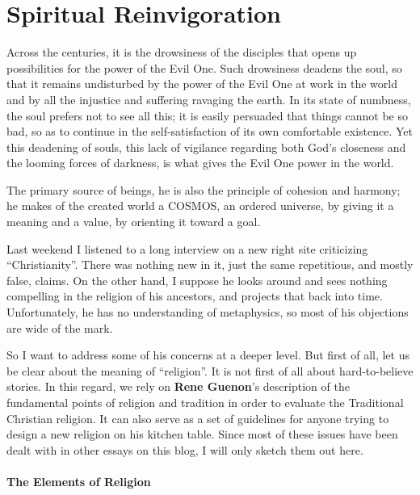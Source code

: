 \section{Spiritual Reinvigoration}

\begin{quotex}
Across the centuries, it is the drowsiness of the disciples that opens up possibilities for the power of the Evil One. Such drowsiness deadens the soul, so that it remains undisturbed by the power of the Evil One at work in the world and by all the injustice and suffering ravaging the earth. In its state of numbness, the soul prefers not to see all this; it is easily persuaded that things cannot be so bad, so as to continue in the self-satisfaction of its own comfortable existence. Yet this deadening of souls, this lack of vigilance regarding both God's closeness and the looming forces of darkness, is what gives the Evil One power in the world.

The primary source of beings, he is also the principle of cohesion and harmony; he makes of the created world a COSMOS, an ordered universe, by giving it a meaning and a value, by orienting it toward a goal.
\end{quotex}


Last weekend I listened to a long interview on a new right site criticizing ``Christianity''. There was nothing new in it, just the same repetitious, and mostly false, claims. On the other hand, I suppose he looks around and sees nothing compelling in the religion of his ancestors, and projects that back into time. Unfortunately, he has no understanding of metaphysics, so most of his objections are wide of the mark.

So I want to address some of his concerns at a deeper level. But first of all, let us be clear about the meaning of ``religion''. It is not first of all about hard-to-believe stories. In this regard, we rely on \textbf{Rene Guenon}'s description of the fundamental points of religion and tradition in order to evaluate the Traditional Christian religion. It can also serve as a set of guidelines for anyone trying to design a new religion on his kitchen table. Since most of these issues have been dealt with in other essays on this blog, I will only sketch them out here.

\paragraph{The Elements of Religion}


